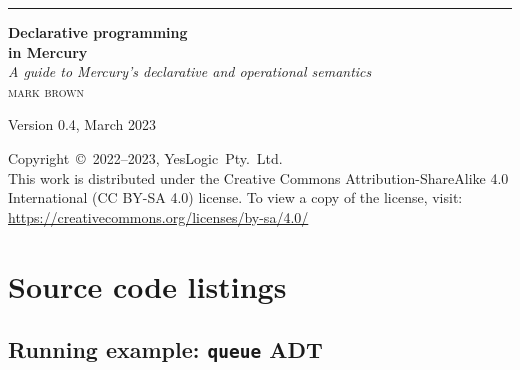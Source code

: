 \documentclass[a4paper,11pt]{book}
\begin{document}
\frontmatter

\begin{titlepage}
\raggedleft
\rule{1pt}{\textheight}
\hspace{0.05\textwidth}
\parbox[b]{0.8\textwidth}{
{\Huge\bfseries Declarative programming \\[0.5\baselineskip] in Mercury}
\\[2\baselineskip]
{\large\textit{A guide to Mercury's declarative and operational semantics}}
\\[4\baselineskip]
{\Large\textsc{mark brown}} %

\vspace{0.5\textheight} %

{Version 0.4, March 2023}
}
\end{titlepage}

\vspace*{\fill}

\noindent
Copyright~\copyright~2022--2023, YesLogic~Pty.~Ltd.\\[0.5\baselineskip]
This work is distributed under the Creative Commons
Attribution-ShareAlike 4.0 International (CC BY-SA 4.0) license.
To view a copy of the license, visit:\\
\href{https://creativecommons.org/licenses/by-sa/4.0/}{https://creativecommons.org/licenses/by-sa/4.0/}

\tableofcontents



\mainmatter









\appendix



\chapter{Source code listings}
\label{sec:listings}

\section{Running example: \texttt{queue} ADT}
\label{sec:listing-queue}

\end{document}
